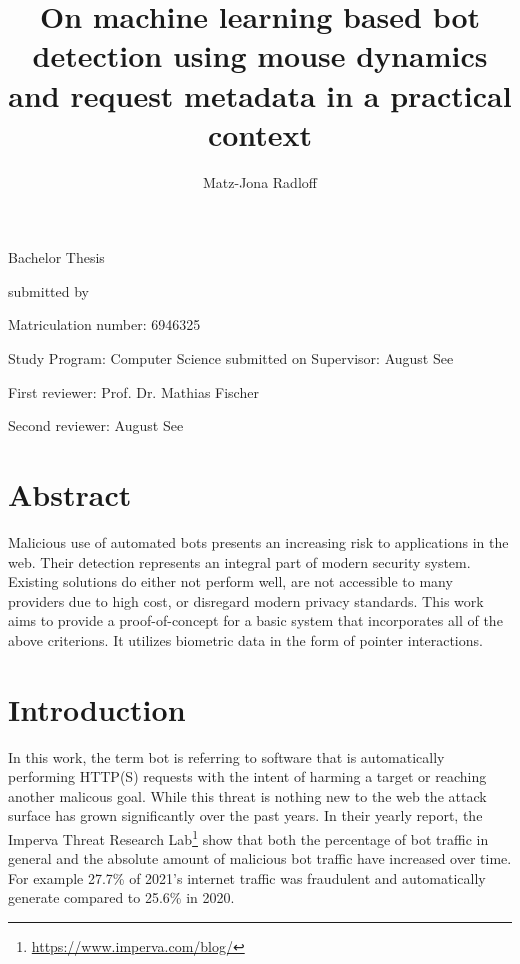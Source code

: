 \documentclass[
    fontsize=12pt,
    headings=small,
    parskip=half,           %
    bibliography=totoc,
    numbers=noenddot,       %
    open=any,               %
    final,                   %
    table
]{scrreprt}
\begin{document}
\title{On machine learning based bot detection using mouse dynamics and request metadata in a practical context}
\author{Matz-Jona Radloff}


\begin{titlepage}
\begin{center}\Large
    \vfill
    Bachelor Thesis
    \vfill
    \makeatletter
    {\Large\textsf{\textbf{\@title}}\par}
    \makeatother
    \vfill
    submitted by
    \par\bigskip
    \makeatletter
    {\@author} \par
    \makeatother
    Matriculation number: 6946325 \par
    Study Program: Computer Science
    \vfill
    \makeatletter
    submitted on {\@date}
    \makeatother
    \vfill
    Supervisor: August See\par
    First reviewer: Prof. Dr. Mathias Fischer \par
    Second reviewer: August See
\end{center}
\end{titlepage}


\chapter*{Abstract}

Malicious use of automated bots presents an increasing risk to applications in the web. Their detection represents an integral part of modern security system. Existing solutions do either not perform well, are not accessible to many providers due to high cost, or disregard modern privacy standards. This work aims to provide a proof-of-concept for a basic system that incorporates all of the above criterions. It utilizes biometric data in the form of pointer interactions.

\tableofcontents

\chapter{Introduction}

In this work, the term bot is referring to software that is automatically performing HTTP(S) requests with the intent of harming a target or reaching another malicous goal. While this threat is nothing new to the web the attack surface has grown significantly over the past years. In their yearly report, the Imperva Threat Research Lab\footnote{\url{https://www.imperva.com/blog/}} show that both the percentage of bot traffic in general and the absolute amount of malicious bot traffic have increased over time.\cite{BAD_BOT_REPORT2020,BAD_BOT_REPORT2021,BAD_BOT_REPORT2022} For example 27.7\% of 2021's internet traffic was fraudulent and automatically generate compared to 25.6\% in 2020.
\end{document}
